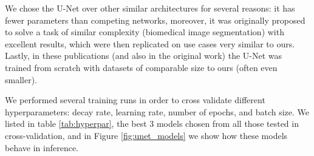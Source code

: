 \documentclass[comsoc,final]{IEEEtran}
\begin{document}
We chose the U-Net over other similar architectures for several reasons: it has fewer parameters than competing networks, moreover, it was originally proposed to solve a task of similar complexity (biomedical image segmentation) with excellent results, which were then replicated on use cases very similar to ours. Lastly, in these publications (and also in the original work) the U-Net was trained from scratch with datasets of comparable size to ours (often even smaller).

We performed several training runs in order to cross validate different hyperparameters: decay rate, learning rate, number of epochs, and batch size. We listed in table \ref{tab:hyperpar}, the best 3 models chosen from all those tested in cross-validation, and in Figure \ref{fig:unet_models} we show how these models behave in inference.
\end{document}
